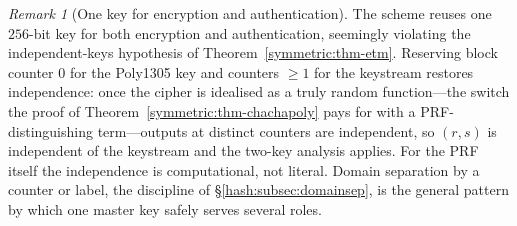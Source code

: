 \documentclass[11pt,a4paper]{article}
\theoremstyle{definition}
\theoremstyle{remark}
\newtheorem{remark}[theorem]{Remark}
\begin{document}
\begin{remark}[One key for encryption and authentication]\label{symmetric:rem-single-key}
The scheme reuses one \(256\)-bit key for both encryption and
authentication, seemingly violating the independent-keys hypothesis
of Theorem~\ref{symmetric:thm-etm}. Reserving block counter \(0\) for
the \textsf{Poly1305} key and counters \(\ge 1\) for the keystream
restores independence: once the cipher is idealised as
a truly random function---the switch the proof of
Theorem~\ref{symmetric:thm-chachapoly} pays for with a
PRF-distinguishing term---outputs at distinct counters are
independent, so \((r, s)\) is independent of the keystream and the
two-key analysis applies. For the PRF itself the independence is
computational, not literal. Domain separation by a counter or label,
the discipline of \S\ref{hash:subsec:domainsep}, is the general
pattern by which one master key safely serves several roles.
\end{remark}
\end{document}
